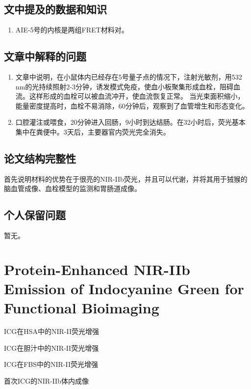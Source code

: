 \documentclass[cn,11pt,chinese]{elegantbook}
\begin{document}
\subsection{文中提及的数据和知识}
\begin{enumerate}
  \item AIE-5号的内核是两组FRET材料对。
\end{enumerate}
\subsection{文章中解释的问题}
\begin{enumerate}[itemsep=1.5ex]
   \item {}
  文章中说明，在小鼠体内已经存在5号量子点的情况下，注射光敏剂，用532 nm的光持续照射2-3分钟，诱发模式免疫，使血小板聚集形成血栓，阻碍血流。这样形成的血栓可以被血流冲开，使血流恢复正常。
  当光束面积缩小，能量密度提高时，血栓不易消除，60分钟后，观察到了血管增生和形态变化。
   \item {}
口腔灌注或喂食，20分钟进入回肠，9小时到达结肠。在32小时后，荧光基本集中在粪便中。3天后，主要器官内荧光完全消失。
 \end{enumerate} 

\subsection{论文结构完整性}
首先说明材料的优势在于很亮的NIR-IIb荧光，并且可以代谢，并将其用于狨猴的脑血管成像、血栓模型的监测和胃肠道成像。

\subsection{个人保留问题}
暂无。

\section{Protein-Enhanced NIR-IIb Emission of Indocyanine Green for Functional Bioimaging}
\begin{introduction}[创新点概要]
  \item ICG在HSA中的NIR-II荧光增强
  \item ICG在胆汁中的NIR-II荧光增强
  \item ICG在FBS中的NIR-II荧光增强
  \item 首次ICG的NIR-IIb体内成像
\end{introduction}
\end{document}
